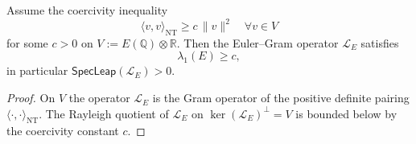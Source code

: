\begin{lemma}
Assume the coercivity inequality
\[
\langle v,v\rangle_{\mathrm{NT}} \ge c\,\|v\|^2 \quad \forall v\in V
\]
for some $c>0$ on $V:=E(\mathbb{Q})\otimes\mathbb{R}$.
Then the Euler--Gram operator $\mathcal L_E$ satisfies
\[
\lambda_1(E) \ge c,
\]
in particular $\mathsf{SpecLeap}(\mathcal L_E)>0$.
\end{lemma}

\begin{proof}
On $V$ the operator $\mathcal L_E$ is the Gram operator of the positive definite
pairing $\langle\cdot,\cdot\rangle_{\mathrm{NT}}$.
The Rayleigh quotient of $\mathcal L_E$ on $\ker(\mathcal L_E)^\perp=V$ is bounded
below by the coercivity constant $c$.
\end{proof}

